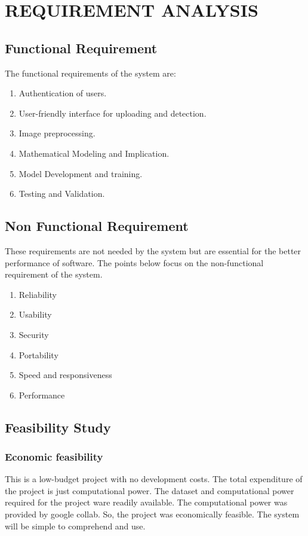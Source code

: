 
\section{REQUIREMENT ANALYSIS}

\subsection{Functional Requirement}
The functional requirements of the system are:
\begin{enumerate}
    \item Authentication of users.
    \item User-friendly interface for uploading and detection.
    \item Image preprocessing.
    \item Mathematical Modeling and Implication.
    \item Model Development and training.
    \item Testing and Validation.

\end{enumerate}

\subsection{Non Functional Requirement}
\justify
These requirements are not needed by the system but are essential for the better
performance of software. The points below focus on the non-functional requirement of
the system.
\begin{enumerate}
    \item Reliability
    \item   Usability
    \item   Security
    \item   Portability
    \item   Speed and responsiveness
    \item  Performance
\end{enumerate}

\subsection{Feasibility Study}

\subsubsection{Economic feasibility}
This is a low-budget project with no development costs. The total expenditure of the
project is just computational power. The dataset and computational power required for
the project ware readily available. The computational power was provided by google
collab. So, the project was economically feasible. The system will be simple to
comprehend and use.

